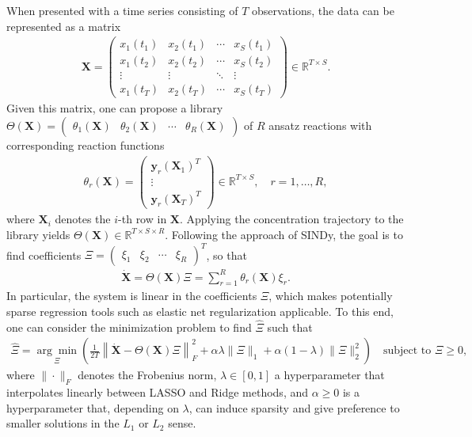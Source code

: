 \documentclass[oneside, abstracton, titlepage]{scrartcl}
\begin{document}
	When presented with a time series consisting of $T$ observations, the data can be represented as a matrix
	\begin{align}
	\textbf{X} = \begin{pmatrix}
		x_1(t_1) & x_2(t_1) & \cdots & x_S(t_1) \\
		x_1(t_2) & x_2(t_2) & \cdots & x_S(t_2) \\
		\vdots   & \vdots   & \ddots & \vdots   \\
		x_1(t_T) & x_2(t_T) & \cdots & x_S(t_T)
	\end{pmatrix} \in \mathbb{R}^{T\times S}.
	\end{align}
	Given this matrix, one can propose a library $\Theta(\textbf{X}) = \begin{pmatrix} \theta_1(\textbf{X}) & \theta_2(\textbf{X}) & \cdots & \theta_R(\textbf{X}) \end{pmatrix}$ of $R$ ansatz reactions with corresponding reaction functions
	\begin{align}
		\theta_r(\textbf{X}) = \begin{pmatrix}
		\textbf{y}_r(\textbf{X}_1)^T \\ \vdots \\ \textbf{y}_r(\textbf{X}_T)^T
		\end{pmatrix}\in \mathbb{R}^{T\times S},\quad r=1,\ldots,R,
	\label{method:the-reactions}\end{align}
	where $\textbf{X}_i$ denotes the $i$-th row in $\textbf{X}$. Applying the concentration trajectory to the library yields $\Theta(\textbf{X})\in\mathbb{R}^{T\times S\times R}$. Following the approach of SINDy, the goal is to find coefficients $\Xi = \begin{pmatrix} \xi_1 & \xi_2 & \cdots & \xi_R
	\end{pmatrix}^T$, so that
	\begin{align}
	\dot{\textbf{X}} = \Theta(\textbf{X})\Xi = \sum_{r=1}^{R}\theta_r(\textbf{X})\xi_r.
	\end{align}
	In particular, the system is linear in the coefficients $\Xi$, which makes potentially sparse regression tools such as elastic net regularization \cite{Zou2005} applicable. To this end, one can consider the minimization problem to find $\hat{\Xi}$ such that
	\begin{align}
		\hat{\Xi} = \underset{\Xi}{\arg\min}\left( \frac{1}{2T}\left\| \dot{\textbf{X}} - \Theta(\textbf{X})\Xi \right\|_F^2 + \alpha\lambda\|\Xi\|_1 + \alpha(1-\lambda)\|\Xi\|_2^2 \right) \quad \text{subject to }\Xi \geq 0,
	\label{method:minimizationproblem}\end{align}
	where $\|\cdot\|_F$ denotes the Frobenius norm, $\lambda\in[0,1]$ a hyperparameter that interpolates linearly between LASSO \cite{Tibshirani1996, Hastie2009} and Ridge \cite{Hoerl1} methods, and $\alpha\geq 0$ is a hyperparameter that, depending on $\lambda$, can induce sparsity and give preference to smaller solutions in the $L_1$ or $L_2$ sense.
\end{document}
